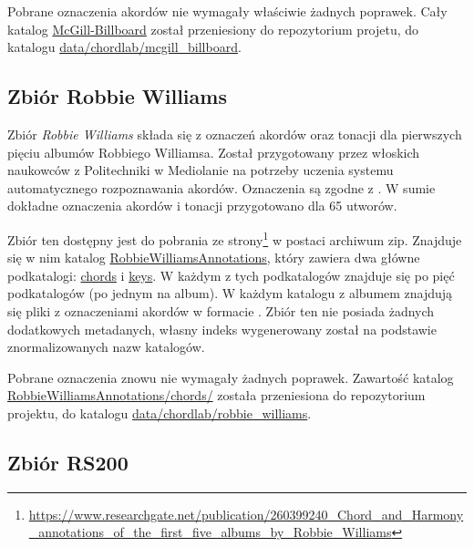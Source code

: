 Pobrane oznaczenia akordów nie wymagały właściwie żadnych poprawek. Cały katalog \url{McGill-Billboard} został przeniesiony do repozytorium projetu, do katalogu \url{data/chordlab/mcgill_billboard}.

\subsection{Zbiór Robbie Williams}

Zbiór \emph{Robbie Williams} \cite{giorgi_automatic_2013} składa się z oznaczeń akordów oraz tonacji dla pierwszych pięciu albumów Robbiego Williamsa. Został przygotowany przez włoskich naukowców z Politechniki w Mediolanie na potrzeby uczenia systemu automatycznego rozpoznawania akordów.  Oznaczenia są zgodne z \cite{harte_towards_nodate}. W sumie dokładne oznaczenia akordów i tonacji przygotowano dla 65 utworów.

Zbiór ten dostępny jest do pobrania ze strony\footnote{\url{https://www.researchgate.net/publication/260399240_Chord_and_Harmony_annotations_of_the_first_five_albums_by_Robbie_Williams}} w postaci archiwum zip. Znajduje się w nim katalog \url{RobbieWilliamsAnnotations}, który zawiera dwa główne podkatalogi: \url{chords} i \url{keys}. W każdym z tych podkatalogów znajduje się po pięć podkatalogów (po jednym na album). W każdym katalogu z albumem znajdują się pliki  z oznaczeniami akordów w formacie . Zbiór ten nie posiada żadnych dodatkowych metadanych, własny indeks wygenerowany został na podstawie znormalizowanych nazw katalogów.

Pobrane oznaczenia znowu nie wymagały żadnych poprawek. Zawartość katalog \url{RobbieWilliamsAnnotations/chords/} została przeniesiona do repozytorium projektu, do katalogu \url{data/chordlab/robbie_williams}.

\subsection{Zbiór RS200}

